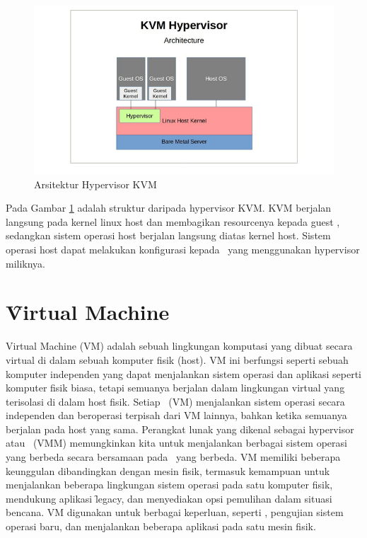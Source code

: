 \begin{figure}
	\centering
	\includegraphics[width=1\textwidth]
		{assets/pics/xen-kvm.png}
	\caption{Arsitektur Hypervisor KVM}
	\label{fig:xen-kvm}
\end{figure}

Pada Gambar \ref{fig:xen-kvm} adalah struktur daripada hypervisor KVM. KVM berjalan langsung pada kernel linux host dan membagikan resourcenya kepada guest \vm, sedangkan sistem operasi host berjalan langsung diatas kernel host. Sistem operasi host dapat melakukan konfigurasi kepada \vm\ yang menggunakan hypervisor miliknya.

\section{\f{Virtual Machine}}

Virtual Machine (VM) adalah sebuah lingkungan komputasi yang dibuat secara virtual di dalam sebuah komputer fisik (host)\cite{Pradilla2016}. VM ini berfungsi seperti sebuah komputer independen yang dapat menjalankan sistem operasi dan aplikasi seperti komputer fisik biasa, tetapi semuanya berjalan dalam lingkungan virtual yang terisolasi di dalam host fisik. Setiap \vm\ (VM) menjalankan sistem operasi secara independen dan beroperasi terpisah dari VM lainnya, bahkan ketika semuanya berjalan pada host yang sama. Perangkat lunak yang dikenal sebagai hypervisor atau \vmm\ (VMM) memungkinkan kita untuk menjalankan berbagai sistem operasi yang berbeda secara bersamaan pada \vm\ yang berbeda. VM memiliki beberapa keunggulan dibandingkan dengan mesin fisik, termasuk kemampuan untuk menjalankan beberapa lingkungan sistem operasi pada satu komputer fisik, mendukung aplikasi \f{legacy}, dan menyediakan opsi pemulihan dalam situasi bencana. VM digunakan untuk berbagai keperluan, seperti \cc, pengujian sistem operasi baru, dan menjalankan beberapa aplikasi pada satu mesin fisik\cite{ibmWhatVirtualMachine}.


